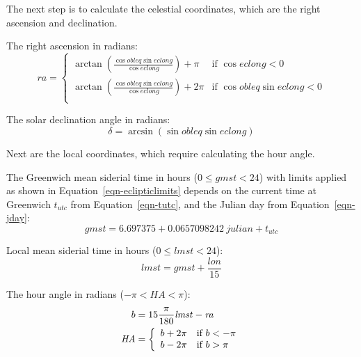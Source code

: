 \documentclass[12pt,letterpaper]{article}
\begin{document}
The next step is to calculate the celestial coordinates, which are the right ascension and declination.

The right ascension in radians:
\begin{equation}
\mathit{ra} = \left\{
\begin{array}{ll}
\arctan\left(  \frac{ \cos\mathit{\mathit{obleq}}\sin{\mathit{eclong}}}{\cos\mathit{eclong}}  \right) + \pi & \text{if $\cos\mathit{eclong}<0$}\\
\arctan\left(  \frac{ \cos\mathit{\mathit{obleq}}\sin{\mathit{eclong}}}{\cos\mathit{eclong}}  \right) + 2\pi & \text{if $\cos\mathit{obleq}\sin\mathit{eclong}<0$}\\
\end{array}
\right.
\end{equation}

The solar declination angle in radians:
\begin{equation}\label{eqn-dec}
\delta = \arcsin \left( \sin \mathit{obleq} \sin \mathit{eclong} \right)
\end{equation}

Next are the local coordinates, which require calculating the hour angle. 

The Greenwich mean siderial time in hours ($0\leq\mathit{gmst}<24$) with limits applied as shown in Equation~\ref{eqn-eclipticlimits} depends on the current time at Greenwich $t_{utc}$ from Equation~\ref{eqn-tutc}, and the Julian day from Equation~\ref{eqn-jday}:
\begin{equation}
\mathit{gmst}= 6.697375 + 0.0657098242~\mathit{julian} + t_{\mathit{utc}}
\end{equation}

Local mean siderial time in hours ($0\leq\mathit{lmst}<24$):
\begin{equation}
\mathit{lmst}= \mathit{gmst} + \frac{\mathit{lon}}{15}
\end{equation}

The hour angle in radians ($-\pi<\mathit{HA}<\pi$):
\begin{align}
b &= 15\frac{\pi}{180}\mathit{lmst} -\mathit{ra}\notag\\
\mathit{HA}&= \left\{
  \begin{array}{ll}
  b + 2\pi & \text{if $b<-\pi$}\\
  b - 2\pi & \text{if $b>\pi$}
  \end{array}
\right.
\end{align}
\end{document}
